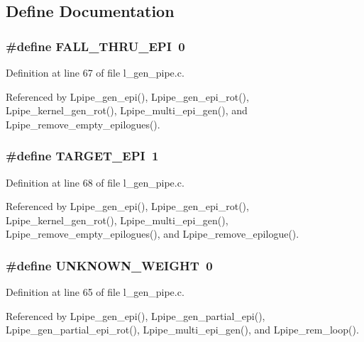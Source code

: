 \subsection{Define Documentation}
\subsubsection{\setlength{\rightskip}{0pt plus 5cm}\#define FALL\_\-THRU\_\-EPI~0}\label{l__gen__pipe_8c_5a0660410880f0cbe74ab9e1554b2e65}




Definition at line 67 of file l\_\-gen\_\-pipe.c.

Referenced by Lpipe\_\-gen\_\-epi(), Lpipe\_\-gen\_\-epi\_\-rot(), Lpipe\_\-kernel\_\-gen\_\-rot(), Lpipe\_\-multi\_\-epi\_\-gen(), and Lpipe\_\-remove\_\-empty\_\-epilogues().
\subsubsection{\setlength{\rightskip}{0pt plus 5cm}\#define TARGET\_\-EPI~1}\label{l__gen__pipe_8c_e4186ebd15ff2109e517a995ff3d27bd}




Definition at line 68 of file l\_\-gen\_\-pipe.c.

Referenced by Lpipe\_\-gen\_\-epi(), Lpipe\_\-gen\_\-epi\_\-rot(), Lpipe\_\-kernel\_\-gen\_\-rot(), Lpipe\_\-multi\_\-epi\_\-gen(), Lpipe\_\-remove\_\-empty\_\-epilogues(), and Lpipe\_\-remove\_\-epilogue().
\subsubsection{\setlength{\rightskip}{0pt plus 5cm}\#define UNKNOWN\_\-WEIGHT~0}\label{l__gen__pipe_8c_c697651b01b512ea5feb51514bde3b69}




Definition at line 65 of file l\_\-gen\_\-pipe.c.

Referenced by Lpipe\_\-gen\_\-epi(), Lpipe\_\-gen\_\-partial\_\-epi(), Lpipe\_\-gen\_\-partial\_\-epi\_\-rot(), Lpipe\_\-multi\_\-epi\_\-gen(), and Lpipe\_\-rem\_\-loop().

